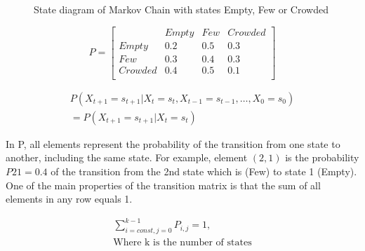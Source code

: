 \begin{figure}[!ht]
\centering
{}
 \caption{ State diagram of Markov Chain with states Empty, Few or Crowded} \label{fig:states}
\end{figure}


\[
P=
  \begin{bmatrix}
  &Empty & Few & Crowded \\
Empty & 0.2&0.5&0.3\\
Few & 0.3&0.4&0.3\\
Crowded& 0.4&0.5&0.1\\
  \end{bmatrix}
\]


\begin{equation}
\begin{split}
\label{equ:1}
P( X _ {t+1} = s _ {t+1} | X _ t = s _ t ,  X _ {t-1} = s _ {t-1},
\ldots ,  X _ 0 = s _ 0 ) \\
= P( X _ {t+1} = s _ {t+1} | X _ t = s _ t )
\end{split}
\end{equation}

In P, all elements represent the probability of the transition from one state to another, including the same state.  For example, element $(2, 1)$ is the probability $P{21} = 0.4$ of the transition from the 2nd state which is (Few) to state 1 (Empty).  One of the main properties of the transition matrix is that the sum of all elements in any row equals 1.

\begin{equation}
\begin{split}
\label{equ:2}
\sum_{i=const, j=0}^{k-1} P_{i, j} = 1,   \\
 \text{Where k is the number of states}
\end{split}
\end{equation}

